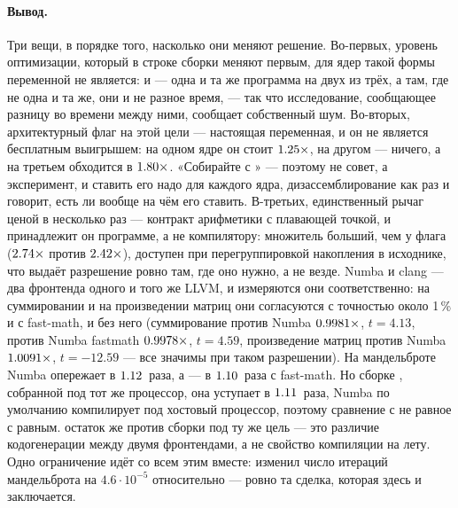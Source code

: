 \paragraph{Вывод.} Три вещи, в порядке того, насколько они меняют решение. Во-первых, уровень
оптимизации, который в строке сборки меняют первым, для ядер такой формы переменной не является:
 и  --- одна и та же программа на двух из трёх, а там, где не одна и та же, они
и не разное время, --- так что исследование, сообщающее разницу во времени между ними, сообщает
собственный шум. Во-вторых, архитектурный флаг на этой цели --- настоящая переменная, и он не
является бесплатным выигрышем: на одном ядре он стоит $\meas{ratio:b1_flags-314:mandelbrot/O2|b1_flags-314:mandelbrot/O3native}{1.25}\times$, на другом --- ничего, а на
третьем обходится в $\meas{ratio:b1_flags-314:matmul/O3native|b1_flags-314:matmul/O2}{1.80}\times$. «Собирайте с » --- поэтому не совет, а
эксперимент, и ставить его надо для каждого ядра, дизассемблирование как раз и говорит, есть ли
вообще на чём его ставить. В-третьих, единственный рычаг ценой в несколько раз --- контракт
арифметики с плавающей точкой, и принадлежит он программе, а не компилятору: множитель больший, чем
у флага ($\meas{ratio:b1_flags-314:arraysum/accum_acc1|b1_flags-314:arraysum/accum_acc4}{2.74}\times$ против $\meas{ratio:b1_flags-314:arraysum/accum_acc1|b1_flags-314:arraysum/O3native_ffast}{2.42}\times$), доступен при  перегруппировкой накопления в
исходнике, что выдаёт разрешение ровно там, где оно нужно, а не везде. Numba и clang --- два фронтенда одного
и того же LLVM, и измеряются они соответственно: на суммировании и на
произведении матриц они согласуются с точностью около 1\,\% и с fast-math, и без него
(суммирование  против Numba $\meas{ratio:b1_flags-314:arraysum/numba_plain|b1_flags-314:arraysum/O2}{0.9981}\times$, $t=4.13$,  против Numba
fastmath $\meas{ratio:b1_flags-314:arraysum/numba_fastmath|b1_flags-314:arraysum/O3native_ffast}{0.9978}\times$, $t=4.59$, произведение матриц  против Numba $\meas{ratio:b1_flags-314:matmul/numba_plain|b1_flags-314:matmul/O2}{1.0091}\times$,
$t=-12.59$ --- все значимы при таком разрешении). На мандельброте Numba опережает  в
$\meas{ratio:b1_flags-314:mandelbrot/O2|b1_flags-314:mandelbrot/numba_plain}{1.12}$~раза, а  --- в $\meas{ratio:b1_flags-314:mandelbrot/O3native_ffast|b1_flags-314:mandelbrot/numba_fastmath}{1.10}$~раза с fast-math. Но сборке
, собранной под тот же процессор, она уступает в $\meas{ratio:b1_flags-314:mandelbrot/numba_plain|b1_flags-314:mandelbrot/O3native}{1.11}$~раза, Numba по умолчанию
компилирует под хостовый процессор, поэтому сравнение с  не равное с равным.
остаток же против сборки под ту же цель --- это различие кодогенерации между двумя
фронтендами, а не свойство компиляции на лету. Одно ограничение идёт со всем этим
вместе:  изменил число итераций мандельброта на $4.6\cdot10^{-5}$ относительно ---
ровно та сделка, которая здесь и заключается.


